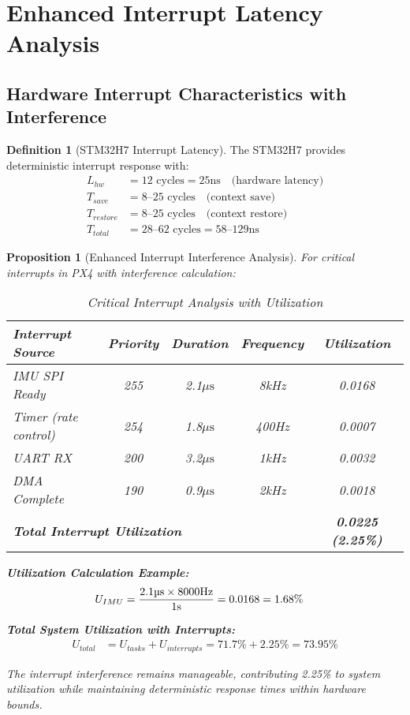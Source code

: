 \documentclass[11pt,a4paper]{article}
\newcommand{\mus}{\ensuremath{\mu\text{s}}}
\newtheorem{proposition}[theorem]{Proposition}
\theoremstyle{definition}
\newtheorem{definition}[theorem]{Definition}
\theoremstyle{remark}
\begin{document}
\section{Enhanced Interrupt Latency Analysis}

\subsection{Hardware Interrupt Characteristics with Interference}

\begin{definition}[STM32H7 Interrupt Latency]
The STM32H7 provides deterministic interrupt response with:
\begin{align}
L_{hw} &= 12 \text{ cycles} = 25\text{ns} \quad \text{(hardware latency)} \\
T_{save} &= 8\text{--}25 \text{ cycles} \quad \text{(context save)} \\
T_{restore} &= 8\text{--}25 \text{ cycles} \quad \text{(context restore)} \\
T_{total} &= 28\text{--}62 \text{ cycles} = 58\text{--}129\text{ns}
\end{align}
\end{definition}

\begin{proposition}[Enhanced Interrupt Interference Analysis]
For critical interrupts in PX4 with interference calculation:

\begin{table}[h]
\centering
\caption{Critical Interrupt Analysis with Utilization}
\begin{tabular}{lcccc}
\toprule
\textbf{Interrupt Source} & \textbf{Priority} & \textbf{Duration} & \textbf{Frequency} & \textbf{Utilization} \\
\midrule
IMU SPI Ready & 255 & 2.1\mus & 8kHz & 0.0168 \\
Timer (rate control) & 254 & 1.8\mus & 400Hz & 0.0007 \\
UART RX & 200 & 3.2\mus & 1kHz & 0.0032 \\
DMA Complete & 190 & 0.9\mus & 2kHz & 0.0018 \\
\midrule
\multicolumn{4}{l}{\textbf{Total Interrupt Utilization}} & \textbf{0.0225 (2.25\%)} \\
\bottomrule
\end{tabular}
\end{table}

\textbf{Utilization Calculation Example:}
\begin{align}
U_{IMU} &= \frac{2.1\text{\textmu s} \times 8000\text{Hz}}{1\text{s}} = 0.0168 = 1.68\%
\end{align}

\textbf{Total System Utilization with Interrupts:}
\begin{align}
U_{total} &= U_{tasks} + U_{interrupts} = 71.7\% + 2.25\% = 73.95\%
\end{align}

The interrupt interference remains manageable, contributing 2.25\% to system utilization while maintaining deterministic response times within hardware bounds.
\end{proposition}
\end{document}
